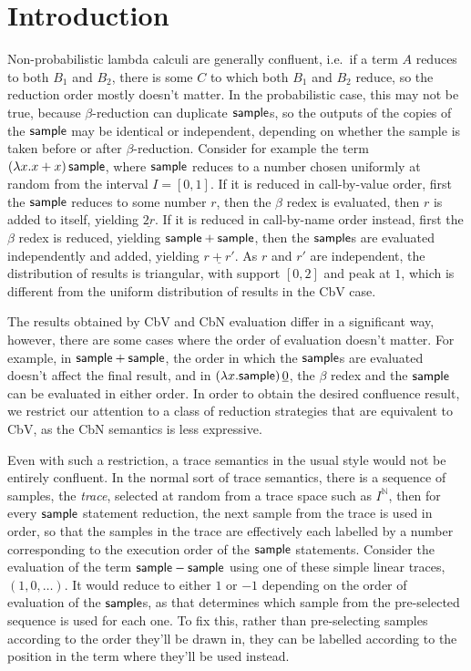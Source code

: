 
\section{Introduction}
\label{sec:intro}

Non-probabilistic lambda calculi are generally confluent, i.e.~if a term $A$ reduces to both $B_1$ and $B_2$, there is some $C$ 
to which both $B_1$ and $B_2$ reduce,
so the reduction order mostly doesn't matter. 
In the probabilistic case, this may not be true, because $\beta$-reduction can duplicate $\mathsf{sample}$s, so the outputs of the copies of the $\mathsf{sample}$ may be identical or independent, depending on whether the sample is taken before or after $\beta$-reduction. Consider for example the term $(\lambda x. x + x)\, \mathsf{sample}$, where $\mathsf{sample}$ reduces to a number chosen uniformly at random from the interval $I = [0,1]$. If it is reduced in call-by-value order, first the $\mathsf{sample}$ reduces to some number $r$, then the $\beta$ redex is evaluated, then $r$ is added to itself, yielding $\underline{2r}$. If it is reduced in call-by-name order instead, first the $\beta$ redex is reduced, yielding $\mathsf{sample} + \mathsf{sample}$, then the $\mathsf{sample}$s are evaluated independently and added, yielding $\underline{r + r'}$. As $r$ and $r'$ are independent, the distribution of results is triangular, with support $[0,2]$ and peak at $1$, which is different from the uniform distribution of results in the CbV case.

The results obtained by CbV and CbN evaluation differ in a significant way, however, there are some cases where the order of evaluation doesn't matter. For example, in $\mathsf{sample} + \mathsf{sample}$, the order in which the $\mathsf{sample}$s are evaluated doesn't affect the final result, and in $(\lambda x. \mathsf{sample})\, \underline 0$, the $\beta$ redex and the $\mathsf{sample}$ can be evaluated in either order. In order to obtain the desired confluence result, we restrict our attention to a class of reduction strategies that are equivalent to CbV, as the CbN semantics is less expressive.

Even with such a restriction, a trace semantics in the usual style would not be entirely confluent. In the normal sort of trace semantics\cite{borgstrom2016lambda}, there is a sequence of samples, the \emph{trace}, selected at random from a trace space such as $I^{\mathbb N}$, then for every $\mathsf{sample}$ statement reduction, the next sample from the trace is used in order, so that the samples in the trace are effectively each labelled by a number corresponding to the execution order of the $\mathsf{sample}$ statements. Consider the evaluation of the term $\mathsf{sample} - \mathsf{sample}$ using one of these simple linear traces, $(1, 0, \dots)$. It would reduce to either $1$ or $-1$ depending on the order of evaluation of the $\mathsf{sample}$s, as that determines which sample from the pre-selected sequence is used for each one. To fix this, rather than pre-selecting samples according to the order they'll be drawn in, they can be labelled according to the position in the term where they'll be used instead.

